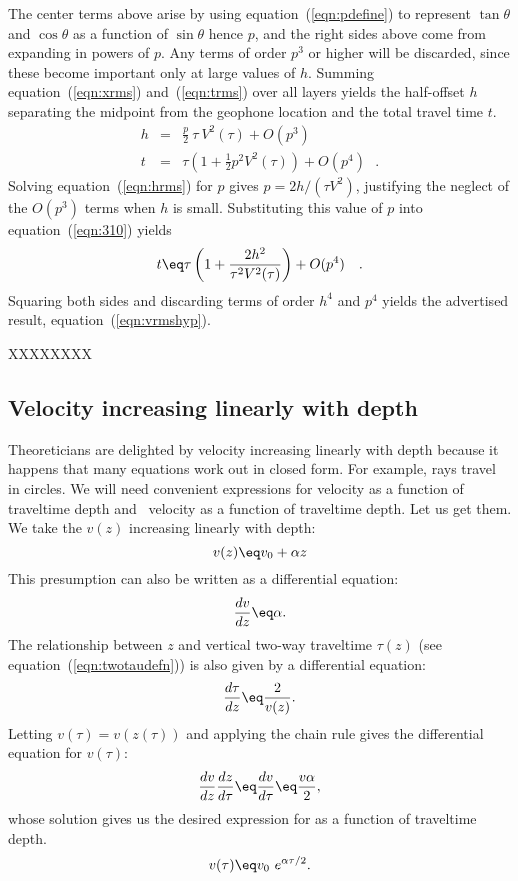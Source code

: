 {The center terms above arise by using equation~(\ref{eqn:pdefine})
to represent $\tan\theta$ and $\cos\theta$
as a function of $\sin\theta$ hence $p$,
and the right sides above come from expanding in powers of $p$.
Any terms of order $p^3$ or higher will be discarded,
since these become important only at large values of $h$.
Summing equation~(\ref{eqn:xrms}) and~(\ref{eqn:trms}) over all layers 
yields the half-offset $h$ separating the midpoint
from the geophone location and the total travel time $t$.
\begin{eqnarray}
\label{eqn:hrms}
h &=&\frac{p}{2}\ \tau \  V^2(\tau) + O(p^3) \\
\label{eqn:310}
t &=&\tau \left( 1 + \frac{1}{2} p^2 V^2(\tau) \right) + O(p^4) \ \ \ .
\end{eqnarray}
Solving equation~(\ref{eqn:hrms}) for $p$ gives $p=2h/(\tau V^2)$,
justifying the neglect of the $O(p^3)$ terms when $h$ is small.
Substituting this value of $p$ into equation~(\ref{eqn:310}) yields
\begin{equation}
t \eq \tau \left( 1 + \frac{2h^2}{\tau^2 V^2(\tau)} \right) + O(p^4) \ \ \ .
\end{equation}
Squaring both sides and discarding terms of order $h^4$ and $p^4$
yields the advertised result, equation~(\ref{eqn:vrmshyp}).

 XXXXXXXX
 }

\subsection{Velocity increasing linearly with depth}
Theoreticians are delighted by velocity increasing linearly with depth
because it happens that many equations work out in closed form.
For example, rays travel in circles.
We will need convenient expressions for velocity
as a function of traveltime depth
and \RMS\ velocity as a function of traveltime depth.
Let us get them.
We take the  $v(z)$ increasing linearly with depth:
\begin{equation}
v(z) \eq v_0 + \alpha z
\end{equation}
%
This presumption can also be written as a differential equation:
\begin{equation}
\frac{dv}{dz} \eq \alpha  .
\end{equation}
%
The relationship between $z$ and vertical two-way traveltime $\tau(z)$
(see equation~(\ref{eqn:twotaudefn})) is also given by a differential equation:
\begin{equation}
\frac{d \tau}{dz} \eq \frac{2}{v(z)}.
\end{equation}
%
Letting $v(\tau)=v(z(\tau))$
and applying the chain rule
gives the differential equation for $v(\tau)$:
\begin{equation}
\frac{dv}{dz}
\frac{dz}{d \tau}
\eq
\frac{dv}{d \tau}
\eq
\frac{v \alpha}{2},
\end{equation}
whose solution gives us the desired expression for 
as a function of traveltime depth.
\begin{equation}
v(\tau) \eq v_0 \ e^{\alpha \tau / 2 }  .
\label{eqn:priorint}
\end{equation}
%

